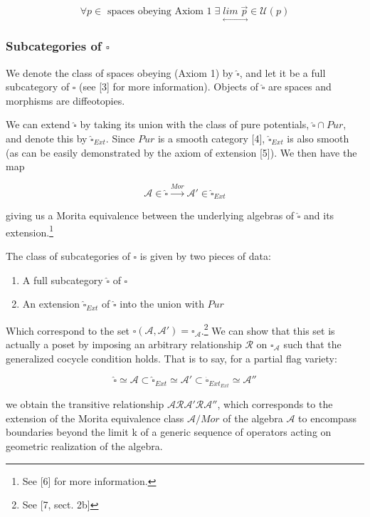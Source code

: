 \documentclass{article}
\begin{document}
	$$\forall p \in \text{ spaces obeying Axiom 1}\; \exists\;\underset{\leftrightarrow}{lim \; \vec{p}} \in \mathcal{U}(p)$$
	
	\subsubsection{Subcategories of $\square$}
	We denote the class of spaces obeying (Axiom 1) by $\widehat{\square}$, and let it be a full subcategory of $\square$ (see [3] for more information). Objects of $\widehat{\square}$ are spaces and morphisms are diffeotopies. 
	
	We can extend $\widehat{\square}$ by taking its union with the class of pure potentials, $\widehat{\square}\cap Pur$, and denote this by $\widehat{\square}_{Ext}$. Since $Pur$ is a smooth category [4], $\widehat{\square}_{Ext}$ is also smooth (as can be easily demonstrated by the axiom of extension [5]). We then have the map
	
	$$\mathcal{A} \in \widehat{\square} \xrightarrow{Mor} \mathcal{A}' \in \widehat{\square}_{Ext}$$
	
	giving us a Morita equivalence between the underlying algebras of $\widehat{\square}$ and its extension.\footnote{See [6] for more information.} 
	
	The class of subcategories of $\square$ is given by two pieces of data:
	
	\begin{enumerate}
		\item{A full subcategory $\widehat{\square}$ of $\square$}
		\item{An extension $\widehat{\square}_{Ext}$ of $\widehat{\square}$ into the union with $Pur$}
	\end{enumerate}
	
		Which correspond to the set $\square(\mathcal{A},\mathcal{A}')=\square_\mathcal{A}$.\footnote{See [7, sect. 2b]} We can show that this set is actually a poset by imposing an arbitrary relationship $\mathcal{R}$ on $\square_\mathcal{A}$ such that the generalized cocycle condition holds. That is to say, for a partial flag variety:
		
		$$\widehat{\square} \simeq \mathcal{A} \subset \widehat{\square}_{Ext} \simeq \mathcal{A}' \subset \widehat{\square}_{Ext_{Ext}} \simeq \mathcal{A}''$$
		
		we obtain the transitive relationship $\mathcal{A}\mathcal{R}\mathcal{A}'\mathcal{R}\mathcal{A}''$, which corresponds to the extension of the Morita equivalence class $\mathcal{A}/Mor$ of the algebra $\mathcal{A}$ to encompass boundaries beyond the limit k of a generic sequence of operators acting on geometric realization of the algebra.
		
\end{document}
